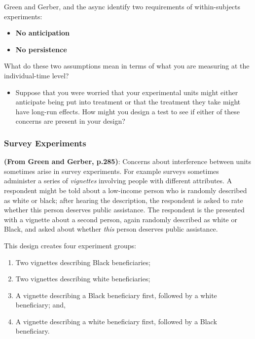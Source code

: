 \documentclass[
]{article}
\providecommand{\tightlist}{%
  \setlength{\itemsep}{0pt}\setlength{\parskip}{0pt}}
\theoremstyle{definition}
\theoremstyle{definition}
\theoremstyle{definition}
\theoremstyle{definition}
\theoremstyle{remark}
\begin{document}
Green and Gerber, and the async identify two requirements of within-subjects experiments:

\begin{itemize}
\tightlist
\item
  \textbf{No anticipation}
\item
  \textbf{No persistence}
\end{itemize}

What do these two assumptions mean in terms of what you are measuring at the individual-time level?

\begin{itemize}
\tightlist
\item
  Suppose that you were worried that your experimental units might either anticipate being put into treatment or that the treatment they take might have long-run effects. How might you design a test to see if either of these concerns are present in your design?
\end{itemize}

\subsubsection{Survey Experiments}\label{survey-experiments}

\textbf{(From Green and Gerber, p.285)}: Concerns about interference between units sometimes arise in survey experiments. For example surveys sometimes administer a series of \emph{vignettes} involving people with different attributes. A respondent might be told about a low-income person who is randomly described as white or black; after hearing the description, the respondent is asked to rate whether this person deserves public assistance. The respondent is the presented with a vignette about a second person, again randomly described as white or Black, and asked about whether \emph{this} person deserves public assistance.

This design creates four experiment groups:

\begin{enumerate}
\def\labelenumi{\arabic{enumi}.}
\tightlist
\item
  Two vignettes describing Black beneficiaries;
\item
  Two vignettes describing white beneficiaries;
\item
  A vignette describing a Black beneficiary first, followed by a white beneficiary; and,
\item
  A vignette describing a white beneficiary first, followed by a Black beneficiary.
\end{enumerate}
\end{document}
